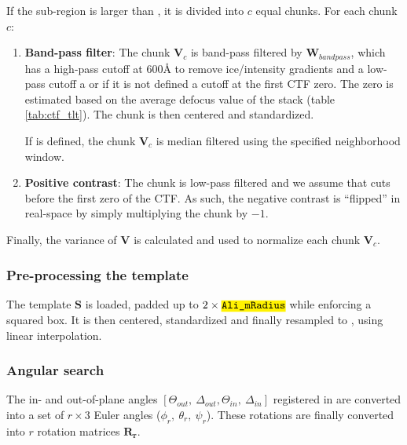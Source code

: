 If the sub-region is larger than , it is divided into $c$ equal chunks. For each chunk $c$:
\begin{enumerate}
    \item \textbf{Band-pass filter}: The chunk $\bm{V}_c$ is band-pass filtered by $\bm{W}_{bandpass}$, which has a high-pass cutoff at 600\si{\angstrom} to remove ice/intensity gradients and a low-pass cutoff a  or if it is not defined a cutoff at the first CTF zero. The zero is estimated based on the average defocus value of the stack (table \ref{tab:ctf_tlt}). The chunk is then centered and standardized.
    \begin{note}If  is defined, the chunk $\bm{V}_c$ is median filtered using the specified neighborhood window.\end{note}
    
    \item \textbf{Positive contrast}: The chunk is low-pass filtered and we assume that  cuts before the first zero of the CTF. As such, the negative contrast is ``flipped'' in real-space by simply multiplying the chunk by $-1$.
\end{enumerate}
Finally, the variance of $\bm{V}$ is calculated and used to normalize each chunk $\bm{V}_c$.

\subsubsection{Pre-processing the template}
The template $\bm{S}$ is loaded, padded up to $2\times\code{Ali\_mRadius}$ while enforcing a squared box. It is then centered, standardized and finally resampled to , using linear interpolation.

\subsubsection{Angular search}

The in- and out-of-plane angles $[\Theta_{out},\ \Delta_{out}, \Theta_{in},\ \Delta_{in}]$ registered in  are converted into a set of $r \times 3$ Euler angles ($\phi_{r},\ \theta_{r},\ \psi_{r}$). These rotations are finally converted into $r$ rotation matrices $\bm{R_{r}}$.

